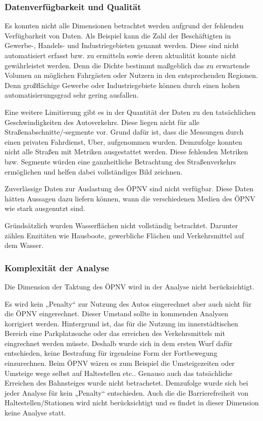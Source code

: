 \subsubsection{Datenverfügbarkeit und Qualität}
Es konnten nicht alle Dimensionen betrachtet werden aufgrund der fehlenden Verfügbarkeit von Daten. Als Beispiel kann die Zahl der Beschäftigten in Gewerbe-, Handels- und Industriegebieten genannt werden. Diese sind nicht automatisiert erfasst bzw. zu ermitteln​ sowie deren aktualität konnte nicht gewährleistet werden.
Denn die Dichte bestimmt maßgeblich das zu erwartende Volumen an möglichen Fahrgästen oder Nutzern in den entsprechenden Regionen. Denn großflächige Gewerbe oder Industriegebiete können durch einen hohen automatisierungsgrad sehr gering ausfallen.

Eine weitere Limitierung gibt es in der Quantität der Daten zu den tatsächlichen Geschwindigkeiten des Autoverkehrs. Diese liegen nicht für alle Straßenabschnitte/-segmente vor​. Grund dafür ist, dass die Messungen durch einen privaten Fahrdienst, Uber, aufgenommen wurden. Demzufolge konnten nicht alle Straßen mit Metriken ausgestattet werden. 
Diese fehlenden Metriken bzw. Segmente würden eine ganzheitliche Betrachtung des Straßenverkehrs ermöglichen und helfen dabei vollständiges Bild zeichnen.

Zuverlässige Daten zur Auslastung des ÖPNV sind nicht verfügbar​. Diese Daten hätten Aussagen dazu liefern können, wann die verschiedenen Medien des ÖPNV wie stark ausgenutzt sind.

Gründsätzlich wurden Wasserflächen nicht vollständig betrachtet. Darunter zählen Enzitäten wie Hausboote, gewerbliche Flächen und Verkehrsmittel auf dem Wasser.
\subsubsection{Komplexität der Analyse}
Die Dimension der Taktung des ÖPNV wird in der Analyse nicht berücksichtigt​.

Es wird kein „Penalty“ zur Nutzung des Autos eingerechnet aber auch nicht für die ÖPNV eingerechnet​. Dieser Umstand sollte in kommenden Analysen korrigiert werden.
Hintergrund ist, das für die Nutzung im innerstädtischen Bereich eine Parkplatzsuche oder das erreichen des Verkehrsmittels mit eingrechnet werden müsste.
Deshalb wurde sich in dem ersten Wurf dafür entschieden, keine Bestrafung für irgendeine Form der Fortbewegung einzurechnen. 
Beim ÖPNV wären es zum Beispiel die Umsteigezeiten oder Umsteige wege selbst auf Haltestellen etc.. 
Genauso auch das tatsächliche Erreichen des Bahnsteiges wurde nicht betrachetet. Demzufolge wurde sich bei jeder Analyse für kein „Penalty“ entschieden.
Auch die die Barrierefreiheit von Haltestellen/Stationen wird nicht berücksichtigt​ und es findet in dieser Dimension keine Analyse statt.

